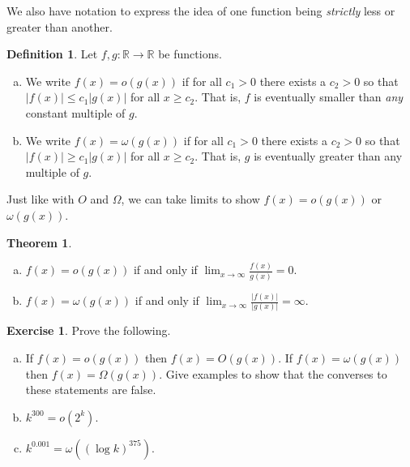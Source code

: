 \documentclass[11pt,letterpaper]{report}
\newcommand{\reals}{\mathbb{R}}
\theoremstyle{definition}
\newtheorem{definition}{Definition}
\newtheorem{exercise}{Exercise}
\newtheorem{theorem}{Theorem}
\begin{document}
We also have notation to express the idea of one function being \textit{strictly} less or greater than another.

\begin{definition}
	Let $f,g:\reals\to \reals$ be functions.
	\begin{enumerate}[(a)]
		\item We write $f(x) = o(g(x))$ if for all $c_1>0$ there exists a $c_2>0$ so that $|f(x)|\leq c_1|g(x)|$ for all $x \geq c_2$. That is, $f$ is eventually smaller than \textit{any} constant multiple of $g$.
		\item We write $f(x)= \omega(g(x))$ if for all $c_1>0$ there exists a $c_2>0$ so that $|f(x)|\geq c_1|g(x)|$ for all $x\geq c_2$. That is, $g$ is eventually greater than any multiple of $g$.
	\end{enumerate}
\end{definition}

Just like with $O$ and $\Omega$, we can take limits to show $f(x) = o(g(x))$ or $\omega(g(x))$.

\begin{theorem}
	\begin{enumerate}[(a)]
		\item $f(x) = o(g(x))$ if and only if $\lim_{x\to \infty}\frac{f(x)}{g(x)} = 0$.
		\item $f(x) = \omega(g(x))$ if and only if $\lim_{x\to \infty}\frac{|f(x)|}{|g(x)|} = \infty$.
	\end{enumerate}
\end{theorem}

\begin{exercise}
	Prove the following.
	\begin{enumerate}[(a)]
		\item If $f(x) = o(g(x))$ then $f(x) = O(g(x))$. If $f(x) = \omega(g(x))$ then $f(x) = \Omega(g(x))$. Give examples to show that the converses to these statements are false.
		\item $k^{300} = o(2^k)$.
		\item $k^{0.001} = \omega((\log k)^{375})$.
	\end{enumerate}
\end{exercise}
\end{document}

